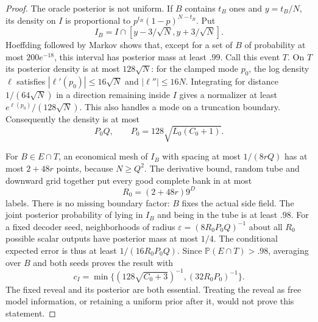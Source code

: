 \documentclass[11pt,letterpaper]{article}
\theoremstyle{definition}\newtheorem{definition}[theorem]{Definition}
\theoremstyle{remark}\newtheorem{remark}[theorem]{Remark}
\newcommand{\Prob}{\mathbb{P}}
\begin{document}
\begin{proof}
The oracle posterior is not uniform. If $B$ contains $t_B$ ones and $y=t_B/N$, its density on $I$ is proportional to $p^{t_B}(1-p)^{N-t_B}$. Put
\[
 I_B=I\cap[y-3/\sqrt N,y+3/\sqrt N].
\]
Hoeffding followed by Markov shows that, except for a set of $B$ of probability at most $200e^{-18}$, this interval has posterior mass at least $.99$. Call this event $T$. On $T$ its posterior density is at most $128\sqrt N$: for the clamped mode $p_0$, the log density $\ell$ satisfies
$|\ell'(p_0)|\le16\sqrt N$ and $|\ell''|\le16N$. Integrating for distance $1/(64\sqrt N)$ in a direction remaining inside $I$ gives a normalizer at least $e^{\ell(p_0)}/(128\sqrt N)$. This also handles a mode on a truncation boundary. Consequently the density is at most
\[
 P_0Q,\qquad P_0=128\sqrt{L_0(C_0+1)}.
\]

For $B\in E\cap T$, an economical mesh of $I_B$ with spacing at most $1/(8rQ)$ has at most $2+48r$ points, because $N\ge Q^2$. The derivative bound, random tube and downward grid together put every good complete bank in at most
\[
 R_0=(2+48r)9^D
\]
labels. There is no missing boundary factor: $B$ fixes the actual side field. The joint posterior probability of lying in $I_B$ and being in the tube is at least $.98$. For a fixed decoder seed, neighborhoods of radius
$\varepsilon=(8R_0P_0Q)^{-1}$ about all $R_0$ possible scalar outputs have posterior mass at most $1/4$. The conditional expected error is thus at least $1/(16R_0P_0Q)$. Since $\Prob(E\cap T)>.98$, averaging over $B$ and both seeds proves the result with
\[
 c_I=\min\{(128\sqrt{C_0+3})^{-1},(32R_0P_0)^{-1}\}.
\]
The fixed reveal and its posterior are both essential. Treating the reveal as free model information, or retaining a uniform prior after it, would not prove this statement.
\end{proof}
\end{document}
